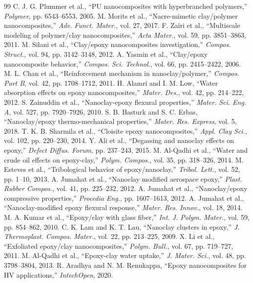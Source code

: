 \documentclass[conference]{IEEEtran}
\begin{document}
\begin{thebibliography}{99}
 C. J. G. Plummer et al., ``PU nanocomposites with hyperbranched polymers,'' \emph{Polymer}, pp. 6543--6553, 2005.
 M. Morits et al., ``Nacre-mimetic clay/polymer nanocomposites,'' \emph{Adv. Funct. Mater.}, vol. 27, 2017.
 F. Za\"{i}ri et al., ``Multiscale modeling of polymer/clay nanocomposites,'' \emph{Acta Mater.}, vol. 59, pp. 3851--3863, 2011.
 M. Silani et al., ``Clay/epoxy nanocomposites investigation,'' \emph{Compos. Struct.}, vol. 94, pp. 3142--3148, 2012.
 A. Yasmin et al., ``Clay/epoxy nanocomposite behavior,'' \emph{Compos. Sci. Technol.}, vol. 66, pp. 2415--2422, 2006.
 M. L. Chan et al., ``Reinforcement mechanism in nanoclay/polymer,'' \emph{Compos. Part B}, vol. 42, pp. 1708--1712, 2011.
 H. Alamri and I. M. Low, ``Water absorption effects on epoxy nanocomposites,'' \emph{Mater. Des.}, vol. 42, pp. 214--222, 2012.
 S. Zainuddin et al., ``Nanoclay-epoxy flexural properties,'' \emph{Mater. Sci. Eng. A}, vol. 527, pp. 7920--7926, 2010.
 S. B. Basturk and S. C. Erbas, ``Nanoclay/epoxy thermo-mechanical properties,'' \emph{Mater. Res. Express}, vol. 5, 2018.
 T. K. B. Sharmila et al., ``Cloisite epoxy nanocomposites,'' \emph{Appl. Clay Sci.}, vol. 102, pp. 220--230, 2014.
 Y. Ali et al., ``Degassing and nanoclay effects on epoxy,'' \emph{Defect Diffus. Forum}, pp. 237--243, 2015.
 M. Al-Qadhi et al., ``Water and crude oil effects on epoxy-clay,'' \emph{Polym. Compos.}, vol. 35, pp. 318--326, 2014.
 M. Esteves et al., ``Tribological behavior of epoxy/nanoclay,'' \emph{Tribol. Lett.}, vol. 52, pp. 1--10, 2013.
 A. Jumahat et al., ``Nanoclay modified aerospace epoxy,'' \emph{Plast. Rubber Compos.}, vol. 41, pp. 225--232, 2012.
 A. Jumahat et al., ``Nanoclay/epoxy compressive properties,'' \emph{Procedia Eng.}, pp. 1607--1613, 2012.
 A. Jumahat et al., ``Nanoclay-modified epoxy flexural response,'' \emph{Mater. Res. Innov.}, vol. 18, 2014.
 M. A. Kumar et al., ``Epoxy/clay with glass fiber,'' \emph{Int. J. Polym. Mater.}, vol. 59, pp. 854--862, 2010.
 C. K. Lam and K. T. Lau, ``Nanoclay clusters in epoxy,'' \emph{J. Thermoplast. Compos. Mater.}, vol. 22, pp. 213--225, 2009.
 X. Li et al., ``Exfoliated epoxy/clay nanocomposites,'' \emph{Polym. Bull.}, vol. 67, pp. 719--727, 2011.
 M. Al-Qadhi et al., ``Epoxy-clay water uptake,'' \emph{J. Mater. Sci.}, vol. 48, pp. 3798--3804, 2013.
 R. Aradhya and N. M. Renukappa, ``Epoxy nanocomposites for HV applications,'' \emph{IntechOpen}, 2020.

\end{thebibliography}
\end{document}
